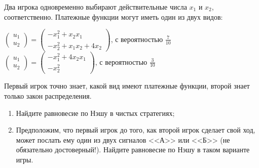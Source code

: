 \begin{problem}

Два игрока одновременно выбирают действительные числа  $x_{1} $  и  $x_{2} $, соответственно.
Платежные функции могут иметь один из двух видов:

 $\left(\begin{array}{l} {u_{1} } \\ {u_{2} } \end{array}\right)=\left(\begin{array}{l} {-x_{1}^{2} +x_{2} x_{1} } \\ {-x_{2}^{2} +x_{1} x_{2} +4x_{2} } \end{array}\right)$, с вероятностью  $\frac{7}{10} $ \\
 $\left(\begin{array}{l} {u_{1} } \\ {u_{2} } \end{array}\right)=\left(\begin{array}{l} {-x_{1}^{2} +4x_{2} x_{1} } \\ {-x_{2}^{2} } \end{array}\right)$, с вероятностью  $\frac{3}{10} $ \par
Первый игрок точно знает, какой вид имеют платежные функции, второй знает только закон распределения.\par
\begin{enumerate}
\item	Найдите равновесие по Нэшу в чистых стратегиях;\par
\item Предположим, что первый игрок до того, как второй игрок сделает свой ход, может послать ему один из двух сигналов <<А>> или <<Б>> (не обязательно достоверный!). Найдите равновесие по Нэшу в таком варианте игры.\par
\end{enumerate}


\begin{sol}

\end{sol}
\end{problem}





